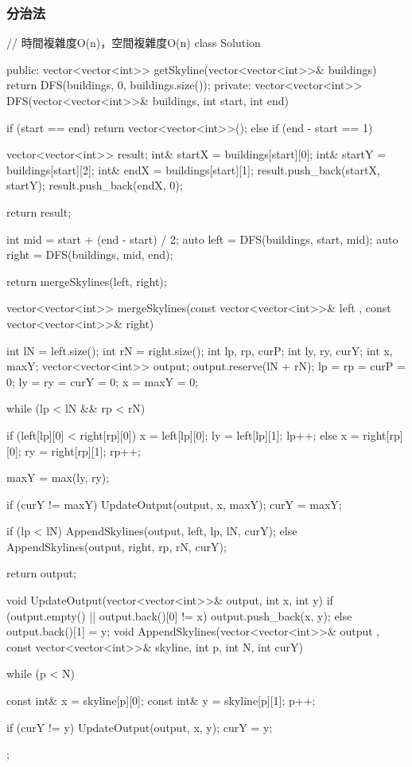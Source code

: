 \subsubsection{分治法}
\begin{Code}
// 時間複雜度O(n)，空間複雜度O(n)
class Solution {
public:
    vector<vector<int>> getSkyline(vector<vector<int>>& buildings) {
        return DFS(buildings, 0, buildings.size());
    }
private:
    vector<vector<int>> DFS(vector<vector<int>>& buildings, int start, int end)
    {
        if (start == end)
        {
            return vector<vector<int>>();
        }
        else if (end - start == 1)
        {
            vector<vector<int>> result;
            int& startX = buildings[start][0];
            int& startY = buildings[start][2];
            int& endX = buildings[start][1];
            result.push_back({startX, startY});
            result.push_back({endX, 0});

            return result;
        }

        int mid = start + (end - start) / 2;
        auto left = DFS(buildings, start, mid);
        auto right = DFS(buildings, mid, end);

        return mergeSkylines(left, right);
    }
    vector<vector<int>> mergeSkylines(const vector<vector<int>>& left
                                      , const vector<vector<int>>& right)
    {
        int lN = left.size();
        int rN = right.size();
        int lp, rp, curP;
        int ly, ry, curY;
        int x, maxY;
        vector<vector<int>> output; output.reserve(lN + rN);
        lp = rp = curP = 0;
        ly = ry = curY = 0;
        x = maxY = 0;

        while (lp < lN && rp < rN)
        {
            if (left[lp][0] < right[rp][0])
            {
                x = left[lp][0];
                ly = left[lp][1];
                lp++;
            }
            else
            {
                x = right[rp][0];
                ry = right[rp][1];
                rp++;
            }

            maxY = max(ly, ry);

            if (curY != maxY)
            {
                UpdateOutput(output, x, maxY);
                curY = maxY;
            }
        }

        if (lp < lN)
            AppendSkylines(output, left, lp, lN, curY);
        else
            AppendSkylines(output, right, rp, rN, curY);


        return output;
    }
    void UpdateOutput(vector<vector<int>>& output, int x, int y)
    {
        if (output.empty() || output.back()[0] != x)
            output.push_back({x, y});
        else
            output.back()[1] = y;
    }
    void AppendSkylines(vector<vector<int>>& output
                        , const vector<vector<int>>& skyline, int p, int N, int curY)
    {
        while (p < N)
        {
            const int& x = skyline[p][0];
            const int& y = skyline[p][1];
            p++;

            if (curY != y)
            {
                UpdateOutput(output, x, y);
                curY = y;
            }
        }
    }
};
\end{Code}


